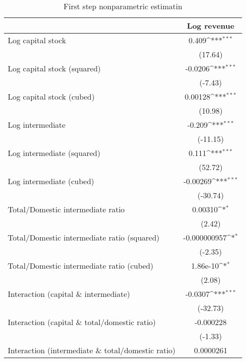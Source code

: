 \begin{table}[htbp]\centering
\def\sym#1{\ifmmode^{#1}\else\(^{#1}\)\fi}
\caption{First step nonparametric estimatin\label{firststep}}
\begin{tabular}{l*{1}{c}}
\hline\hline
                    &\multicolumn{1}{c}{Log revenue}\\
\hline
Log capital stock   &       0.409\sym{***}\\
                    &     (17.64)         \\
[1em]
Log capital stock (squared)&     -0.0206\sym{***}\\
                    &     (-7.43)         \\
[1em]
Log capital stock (cubed)&     0.00128\sym{***}\\
                    &     (10.98)         \\
[1em]
Log intermediate    &      -0.209\sym{***}\\
                    &    (-11.15)         \\
[1em]
Log intermediate (squared)&       0.111\sym{***}\\
                    &     (52.72)         \\
[1em]
Log intermediate (cubed)&    -0.00269\sym{***}\\
                    &    (-30.74)         \\
[1em]
Total/Domestic intermediate ratio&     0.00310\sym{*}  \\
                    &      (2.42)         \\
[1em]
Total/Domestic intermediate ratio (squared)&-0.000000957\sym{*}  \\
                    &     (-2.35)         \\
[1em]
Total/Domestic intermediate ratio (cubed)&    1.86e-10\sym{*}  \\
                    &      (2.08)         \\
[1em]
Interaction (capital \& intermediate)&     -0.0307\sym{***}\\
                    &    (-32.73)         \\
[1em]
Interaction (capital \& total/domestic ratio)&   -0.000228         \\
                    &     (-1.33)         \\
[1em]
Interaction (intermediate \& total/domestic ratio)&   0.0000261         \\

\end{tabular}
\end{table}
